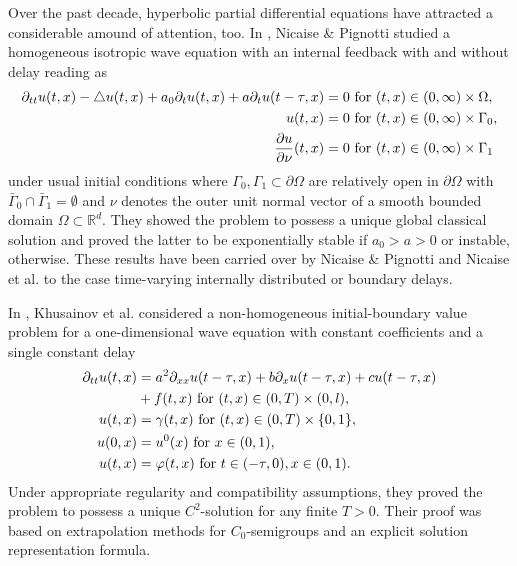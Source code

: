\documentclass[12pt]{article}
\numberwithin{equation}{section}
\numberwithin{equation}{section}
\begin{document}
Over the past decade, hyperbolic partial differential equations have attracted a considerable amound of attention, too.
In \cite{NiPi2006}, Nicaise \& Pignotti studied a homogeneous isotropic wave equation 
with an internal feedback with and without delay reading as
\begin{equation}
	\begin{split}
		\partial_{tt} u(t, x) - \triangle u(t, x) + a_{0} \partial_{t} u(t, x) + a \partial_{t} u(t - \tau, x) &= 0
		\text{ for } (t, x) \in (0, \infty) \times \Omega, \\
		u(t, x) &= 0 \text{ for } (t, x) \in (0, \infty) \times \Gamma_{0}, \\
		\frac{\partial u}{\partial \nu}(t, x) &= 0 \text{ for } (t, x) \in (0, \infty) \times \Gamma_{1}
	\end{split}
	\notag
\end{equation}
under usual initial conditions
where $\Gamma_{0}, \Gamma_{1} \subset \partial \Omega$ are relatively open in $\partial \Omega$
with $\bar{\Gamma}_{0} \cap \bar{\Gamma}_{1} = \emptyset$
and $\nu$ denotes the outer unit normal vector of a smooth bounded domain $\Omega \subset \mathbb{R}^{d}$.
They showed the problem to possess a unique global classical solution and proved the latter
to be exponentially stable if $a_{0} > a > 0$ or instable, otherwise.
These results have been carried over by Nicaise \& Pignotti \cite{NiPi2008}
and Nicaise et al. \cite{NiPiVa2011}
to the case time-varying internally distributed or boundary delays.

In \cite{KhuPoAzi2013}, Khusainov et al. considered a non-homogeneous initial-boundary value problem
for a one-dimensional wave equation with constant coefficients and a single constant delay
\begin{equation}
	\begin{split}
		\partial_{tt} u(t, x) &= a^{2} \partial_{xx} u(t - \tau, x) + b \partial_{x} u(t - \tau, x) + c u(t - \tau, x) \\
		&+ f(t, x) \text{ for } (t, x) \in (0, T) \times (0, l), \\
		u(t, x) &= \gamma(t, x) \text{ for } (t, x) \in (0, T) \times \{0, 1\}, \\
		u(0, x) &= u^{0}(x) \text{ for } x \in (0, 1), \\
		u(t, x) &= \varphi(t, x) \text{ for } t \in (-\tau, 0), x \in (0, 1).
	\end{split}
	\notag
\end{equation}
Under appropriate regularity and compatibility assumptions,
they proved the problem to possess a unique $C^{2}$-solution for any finite $T > 0$.
Their proof was based on extrapolation methods for $C_{0}$-semigroups and an explicit solution representation formula.
\end{document}
